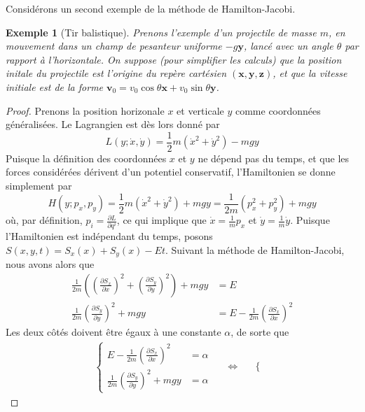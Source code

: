 \documentclass[11pt,oneside,a4paper]{article}
\newcommand{\dif}[2]{\frac{\partial #1}{\partial #2}}
\newtheorem{example}[theorem]{Exemple}
\begin{document}
    Considérons un second exemple de la méthode de Hamilton-Jacobi.

    \begin{example}[Tir balistique]\label{ex: bal}
      Prenons l'exemple d'un projectile de masse $m$, en mouvement dans un champ de pesanteur uniforme $-g\bm{y}$, lancé avec un angle $\theta$ par rapport à l'horizontale. On suppose (pour simplifier les calculs) que la position initale du projectile est l'origine du repère cartésien $\left(\bm{x},\bm{y},\bm{z}\right)$, et que la vitesse initiale est de la forme $\bm{v}_0 = v_0\cos\theta\bm{x}+v_0\sin\theta\bm{y}$.
    \end{example}
    \begin{proof}
      Prenons la position horizonale $x$ et verticale $y$ comme coordonnées généralisées. Le Lagrangien est dès lors donné par
      \begin{equation}
        L(y;\dot{x},\dot{y}) = \frac{1}{2}m\left(\dot{x}^2+\dot{y}^2\right) - mgy
      \end{equation}
      Puisque la définition des coordonnées $x$ et $y$ ne dépend pas du temps, et que les forces considérées dérivent d'un potentiel conservatif, l'Hamiltonien se donne simplement par
      \begin{equation}
        H(y;p_x,p_y) = \frac{1}{2}m\left(\dot{x}^2+\dot{y}^2\right) + mgy = \frac{1}{2m}\left(p_x^2+p_y^2\right) + mgy
      \end{equation}
      où, par définition, $p_i = \dif{L}{q^i}$, ce qui implique que $\dot{x} = \frac{1}{m}p_x$ et $\dot{y} = \frac{1}{m}\dot{y}$. Puisque l'Hamiltonien est indépendant du temps, posons $S(x,y,t) = S_x(x)+S_y(x)-Et$. Suivant la méthode de Hamilton-Jacobi, nous avons alors que 
      \begin{align}
        \frac{1}{2m}\left(\left(\dif{S_x}{x}\right)^2+\left(\dif{S_y}{y}\right)^2\right) + mgy &= E\\
        \frac{1}{2m}\left(\dif{S_y}{y}\right)^2+mgy &= E-\frac{1}{2m}\left(\dif{S_x}{x}\right)^2
      \end{align}
      Les deux côtés doivent être égaux à une constante $\alpha$, de sorte que
      \begin{align}
        \begin{cases}
          E-\frac{1}{2m}\left(\dif{S_x}{x}\right)^2 &= \alpha\\
          \frac{1}{2m}\left(\dif{S_y}{y}\right)^2+mgy &= \alpha
        \end{cases} &
        &\Leftrightarrow &
        &\begin{cases}

\end{cases}
\end{align}
\end{proof}
\end{document}
